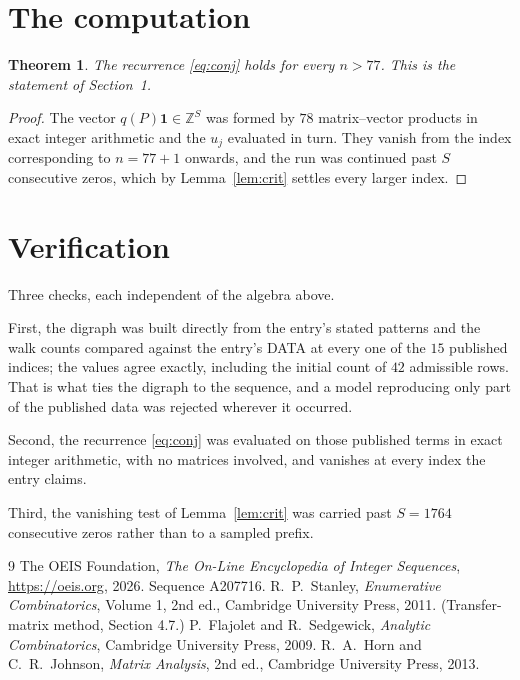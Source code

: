 \documentclass[11pt,a4paper]{article}
\theoremstyle{plain}
\newtheorem{theorem}{Theorem}
\theoremstyle{definition}
\begin{document}
\section{The computation}

\begin{theorem}
The recurrence \eqref{eq:conj} holds for every $n>77$. This is the statement of
Section~1.
\end{theorem}

\begin{proof}
The vector $q(P)\mathbf{1}\in\mathbb{Z}^{S}$ was formed by $78$ matrix--vector
products in exact integer arithmetic and the $u_j$ evaluated in turn. They vanish from the
index corresponding to $n=77+1$ onwards, and the run was continued past $S$ consecutive
zeros, which by Lemma~\ref{lem:crit} settles every larger index.
\end{proof}

\section{Verification}

Three checks, each independent of the algebra above.

First, the digraph was built directly from the entry's stated patterns and the walk counts
compared against the entry's DATA at every one of the $15$ published indices; the
values agree exactly, including the initial count of $42$ admissible rows. That is
what ties the digraph to the sequence, and a model reproducing only part of the published
data was rejected wherever it occurred.

Second, the recurrence \eqref{eq:conj} was evaluated on those published terms in exact
integer arithmetic, with no matrices involved, and vanishes at every index the entry claims.

Third, the vanishing test of Lemma~\ref{lem:crit} was carried past $S=1764$ consecutive
zeros rather than to a sampled prefix.

\begin{thebibliography}{9}
 The OEIS Foundation, \emph{The On-Line Encyclopedia of Integer
Sequences}, \url{https://oeis.org}, 2026. Sequence A207716.
 R.~P.~Stanley, \emph{Enumerative Combinatorics}, Volume 1, 2nd ed.,
Cambridge University Press, 2011. (Transfer-matrix method, Section 4.7.)
 P.~Flajolet and R.~Sedgewick, \emph{Analytic Combinatorics}, Cambridge
University Press, 2009.
 R.~A.~Horn and C.~R.~Johnson, \emph{Matrix Analysis}, 2nd ed., Cambridge
University Press, 2013.
\end{thebibliography}
\end{document}
